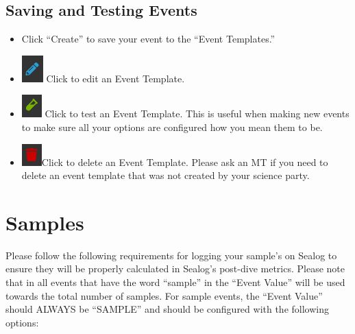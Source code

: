 \documentclass[
  letterpaper,
  DIV=11,
  numbers=noendperiod]{scrreprt}
\providecommand{\tightlist}{%
  \setlength{\itemsep}{0pt}\setlength{\parskip}{0pt}}\usepackage{longtable,booktabs,array}
\begin{document}
\hypertarget{saving-and-testing-events}{%
\subsection{Saving and Testing Events}\label{saving-and-testing-events}}

\begin{itemize}
\tightlist
\item
  Click ``Create'' to save your event to the ``Event Templates.''
\item
  \includegraphics{images/image4.png} Click to edit an Event Template.
\item
  \includegraphics{images/image35.png} Click to test an Event Template.
  This is useful when making new events to make sure all your options
  are configured how you mean them to be.
\item
  \includegraphics{images/image26.png}Click to delete an Event Template.
  Please ask an MT if you need to delete an event template that was not
  created by your science party.
\end{itemize}

\hypertarget{samples}{%
\section{Samples}\label{samples}}

Please follow the following requirements for logging your sample's on
Sealog to ensure they will be properly calculated in Sealog's post-dive
metrics. Please note that in all events that have the word ``sample'' in
the ``Event Value'' will be used towards the total number of samples.
For sample events, the ``Event Value'' should ALWAYS be ``SAMPLE'' and
should be configured with the following options:
\end{document}
